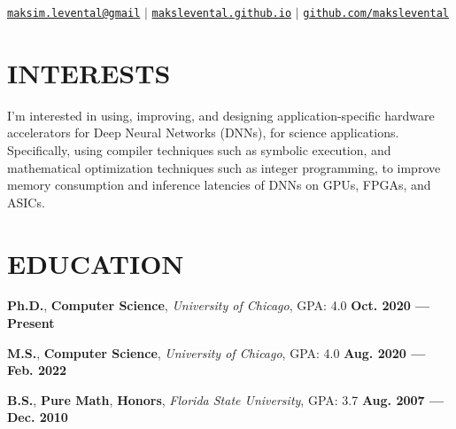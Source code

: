 \documentclass[11pt,letterpaper,roman,colorlinks,linkcolor=blue]{moderncv}
\newcommand*{\modern}{\fontfamily{qhv}\selectfont}
\newcommand{\mystyle}[1]{\textcolor{mygrey}{\modern #1}}
\newcommand{\mysectionstyle}[1]{\large\mystyle{#1}}
\begin{document}
\makecvtitle

\vspace{-16mm}
\begin{center}
\mystyle{\href{maksim.levental@gmail.com}{\texttt{maksim.levental@gmail}} $|$ \href{https://makslevental.github.io/}{\texttt{makslevental.github.io}} $|$ \href{https://github.com/makslevental}{\texttt{github.com/makslevental}}}
\end{center}


\section{\mysectionstyle{INTERESTS}}

I'm interested in using, improving, and designing application-specific hardware accelerators for Deep Neural Networks (DNNs), for science applications. 
Specifically, using compiler techniques such as symbolic execution, and mathematical optimization techniques such as integer programming, to improve memory consumption and inference latencies of DNNs on GPUs, FPGAs, and ASICs. 


\section{\mysectionstyle{EDUCATION}}

\textbf{Ph.D.}, \textbf{Computer Science}, \emph{University of Chicago}, GPA: 4.0
\hfill \textbf{Oct. 2020 --- Present}

\textbf{M.S.}, \textbf{Computer Science}, \emph{University of Chicago}, GPA: 4.0
\hfill \textbf{Aug. 2020 --- Feb. 2022}


\textbf{B.S.}, \textbf{Pure Math}, \textbf{Honors}, \emph{Florida State University}, GPA: 3.7
\hfill \textbf{Aug. 2007 --- Dec. 2010}

\end{document}
